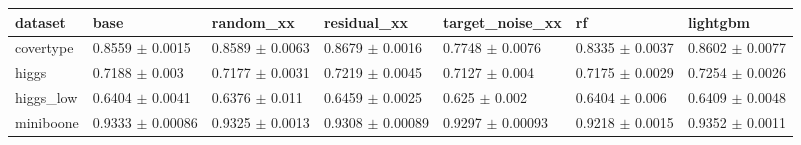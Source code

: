 \begin{tabular}{lllllll}
\toprule
dataset & base & random\_xx & residual\_xx & target\_noise\_xx & rf & lightgbm \\
\midrule
covertype & 0.8559 $\pm$ 0.0015 & 0.8589 $\pm$ 0.0063 & 0.8679 $\pm$ 0.0016 & 0.7748 $\pm$ 0.0076 & 0.8335 $\pm$ 0.0037 & 0.8602 $\pm$ 0.0077 \\
higgs & 0.7188 $\pm$ 0.003 & 0.7177 $\pm$ 0.0031 & 0.7219 $\pm$ 0.0045 & 0.7127 $\pm$ 0.004 & 0.7175 $\pm$ 0.0029 & 0.7254 $\pm$ 0.0026 \\
higgs\_low & 0.6404 $\pm$ 0.0041 & 0.6376 $\pm$ 0.011 & 0.6459 $\pm$ 0.0025 & 0.625 $\pm$ 0.002 & 0.6404 $\pm$ 0.006 & 0.6409 $\pm$ 0.0048 \\
miniboone & 0.9333 $\pm$ 0.00086 & 0.9325 $\pm$ 0.0013 & 0.9308 $\pm$ 0.00089 & 0.9297 $\pm$ 0.00093 & 0.9218 $\pm$ 0.0015 & 0.9352 $\pm$ 0.0011 \\
\bottomrule
\end{tabular}
